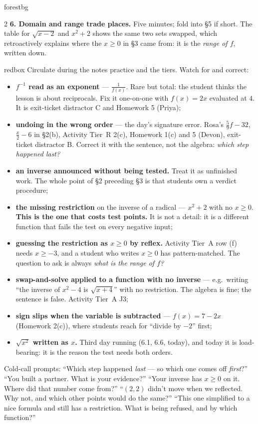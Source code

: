 \documentclass[10pt]{article}
\begin{document}
\begin{skillbox}[Lesson]{forestbg}
\begin{multicols}{2}
\textbf{6. Domain and range trade places.} Five minutes; fold into \S5 if short. The table for
$\sqrt{x-2}$ and $x^{2}+2$ shows the same two sets swapped, which retroactively explains where the
$x\ge0$ in \S3 came from: it is the \emph{range of $f$}, written down.
\end{multicols}
\end{skillbox}

\begin{skillbox}{redbox}
Circulate during the notes practice and the tiers. Watch for and correct:
\begin{itemize}[leftmargin=1.2em, nosep]
  \item \textbf{$f^{-1}$ read as an exponent} --- $\frac{1}{f(x)}$. Rare but total: the student thinks the lesson is about reciprocals. Fix it one-on-one with $f(x)=2x$ evaluated at $4$. It is exit-ticket distractor C and Homework 5 (Priya);
  \item \textbf{undoing in the wrong order} --- the day's signature error. Rosa's $\frac59f-32$, $\frac{x}{2}-6$ in \S2(b), Activity Tier~R 2(c), Homework 1(c) and 5 (Devon), exit-ticket distractor B. Correct it with the sentence, not the algebra: \emph{which step happened last?}
  \item \textbf{an inverse announced without being tested.} Treat it as unfinished work. The whole point of \S2 preceding \S3 is that students own a verdict procedure;
  \item \textbf{the missing restriction} on the inverse of a radical --- $x^{2}+2$ with no $x\ge0$. \textbf{This is the one that costs test points.} It is not a detail: it is a different function that fails the test on every negative input;
  \item \textbf{guessing the restriction as $x\ge0$ by reflex.} Activity Tier~A row (f) needs $x\ge-3$, and a student who writes $x\ge0$ has pattern-matched. The question to ask is always \emph{what is the range of $f$?}
  \item \textbf{swap-and-solve applied to a function with no inverse} --- e.g.\ writing ``the inverse of $x^{2}-4$ is $\sqrt{x+4}$'' with no restriction. The algebra is fine; the sentence is false. Activity Tier~A J3;
  \item \textbf{sign slips when the variable is subtracted} --- $f(x)=7-2x$ (Homework 2(c)), where students reach for ``divide by $-2$'' first;
  \item \textbf{$\sqrt{x^{2}}$ written as $x$.} Third day running (6.1, 6.6, today), and today it is load-bearing: it is the reason the test needs both orders.
\end{itemize}
Cold-call prompts: ``Which step happened \emph{last} --- so which one comes off \emph{first}?''
``You built a partner. What is your evidence?'' ``Your inverse has $x\ge0$ on it. Where did that
number come from?'' ``$(2,2)$ didn't move when we reflected. Why not, and which other points would
do the same?'' ``This one simplified to a nice formula and still has a restriction. What is being
refused, and by which function?''
\end{skillbox}
\end{document}
